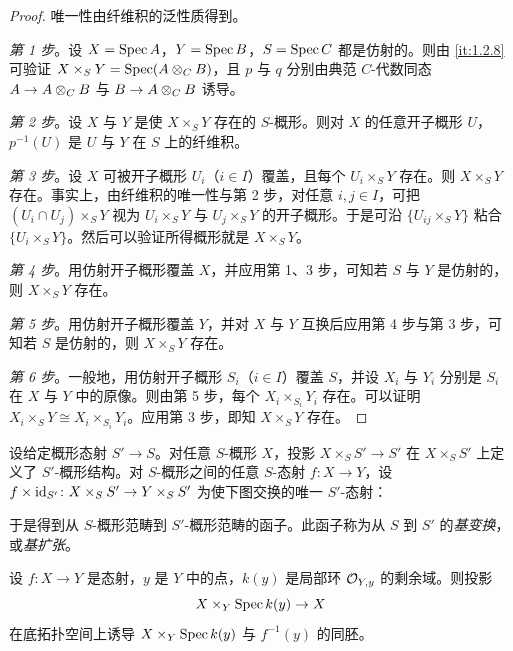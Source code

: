 \begin{proof}
唯一性由纤维积的泛性质得到。

\emph{第 1 步}。设 $X=\operatorname{Spec} A$，$Y=\operatorname{Spec} B$，$S=\operatorname{Spec} C$ 都是仿射的。则由 \ref{it:1.2.8} 可验证 $X\times_S Y=\operatorname{Spec}(A\otimes_C B)$，且 $p$ 与 $q$ 分别由典范 $C$-代数同态 $A\to A\otimes_C B$ 与 $B\to A\otimes_C B$ 诱导。

\emph{第 2 步}。设 $X$ 与 $Y$ 是使 $X\times_S Y$ 存在的 $S$-概形。则对 $X$ 的任意开子概形 $U$，$p^{-1}(U)$ 是 $U$ 与 $Y$ 在 $S$ 上的纤维积。

\emph{第 3 步}。设 $X$ 可被开子概形 $U_i$（$i\in I$）覆盖，且每个 $U_i\times_S Y$ 存在。则 $X\times_S Y$ 存在。事实上，由纤维积的唯一性与第 2 步，对任意 $i,j\in I$，可把 $(U_i\cap U_j)\times_S Y$ 视为 $U_i\times_S Y$ 与 $U_j\times_S Y$ 的开子概形。于是可沿 $\{U_{ij}\times_S Y\}$ 粘合 $\{U_i\times_S Y\}$。然后可以验证所得概形就是 $X\times_S Y$。

\emph{第 4 步}。用仿射开子概形覆盖 $X$，并应用第 1、3 步，可知若 $S$ 与 $Y$ 是仿射的，则 $X\times_S Y$ 存在。

\emph{第 5 步}。用仿射开子概形覆盖 $Y$，并对 $X$ 与 $Y$ 互换后应用第 4 步与第 3 步，可知若 $S$ 是仿射的，则 $X\times_S Y$ 存在。

\emph{第 6 步}。一般地，用仿射开子概形 $S_i$（$i\in I$）覆盖 $S$，并设 $X_i$ 与 $Y_i$ 分别是 $S_i$ 在 $X$ 与 $Y$ 中的原像。则由第 5 步，每个 $X_i\times_{S_i}Y_i$ 存在。可以证明 $X_i\times_S Y\cong X_i\times_{S_i}Y_i$。应用第 3 步，即知 $X\times_S Y$ 存在。
\end{proof}

设给定概形态射 $S'\to S$。对任意 $S$-概形 $X$，投影 $X\times_S S'\to S'$ 在 $X\times_S S'$ 上定义了 $S'$-概形结构。对 $S$-概形之间的任意 $S$-态射 $f\colon X\to Y$，设 $f\times\operatorname{id}_{S'}\colon X\times_S S'\to Y\times_S S'$ 为使下图交换的唯一 $S'$-态射：
\begin{center}
\end{center}
于是得到从 $S$-概形范畴到 $S'$-概形范畴的函子。此函子称为从 $S$ 到 $S'$ 的\emph{基变换}，或\emph{基扩张}。

\begin{proposition}\label{it:1.3.21}
设 $f\colon X\to Y$ 是态射，$y$ 是 $Y$ 中的点，$k(y)$ 是局部环 $\mathcal{O}_{Y,y}$ 的剩余域。则投影
\[
X\times_Y \operatorname{Spec} k(y)\to X
\]
在底拓扑空间上诱导 $X\times_Y \operatorname{Spec} k(y)$ 与 $f^{-1}(y)$ 的同胚。
\end{proposition}

